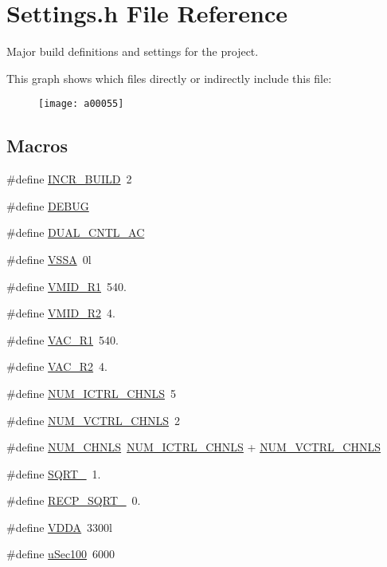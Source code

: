 \hypertarget{a00031}{\section{Settings.\-h File Reference}
\label{a00031}
}


Major build definitions and settings for the project.  


This graph shows which files directly or indirectly include this file\-:
\nopagebreak
\begin{figure}[H]
\begin{center}
\leavevmode
\texttt{[image: a00055]}
\end{center}
\end{figure}
\subsection*{Macros}
\begin{DoxyCompactItemize}
\item 
\#define \hyperlink{a00031_abf493281a7e64fe88660c38753e18d56}{I\-N\-C\-R\-\_\-\-B\-U\-I\-L\-D}~2
\item 
\#define \hyperlink{a00031_ad72dbcf6d0153db1b8d8a58001feed83}{D\-E\-B\-U\-G}
\item 
\#define \hyperlink{a00031_a600b96e7a1d3cd28e228833bb61f8074}{D\-U\-A\-L\-\_\-\-C\-N\-T\-L\-\_\-\-A\-C}
\item 
\#define \hyperlink{a00031_a3c2e957a61cfa19e31e8477fe3aacab8}{V\-S\-S\-A}~0l
\item 
\#define \hyperlink{a00031_a511faa1530ba984d340a884a97e6a80a}{V\-M\-I\-D\-\_\-\-R1}~540.
\item 
\#define \hyperlink{a00031_a86d7f47e3c125143c21e1ca2836eb4ab}{V\-M\-I\-D\-\_\-\-R2}~4.
\item 
\#define \hyperlink{a00031_a67fad1f78c49251e39fa6f1d5ff43e9e}{V\-A\-C\-\_\-\-R1}~540.
\item 
\#define \hyperlink{a00031_a087778c4195e73f588e5c3cf7d9e9206}{V\-A\-C\-\_\-\-R2}~4.
\item 
\#define \hyperlink{a00031_a69b2e41c3deaae85991311202c4a1a14}{N\-U\-M\-\_\-\-I\-C\-T\-R\-L\-\_\-\-C\-H\-N\-L\-S}~5
\item 
\#define \hyperlink{a00031_a42a316162edffd07a32e68a889760c06}{N\-U\-M\-\_\-\-V\-C\-T\-R\-L\-\_\-\-C\-H\-N\-L\-S}~2
\item 
\#define \hyperlink{a00031_afe433b138bb71d8d26b6e0907e656d1b}{N\-U\-M\-\_\-\-C\-H\-N\-L\-S}~\hyperlink{a00031_a69b2e41c3deaae85991311202c4a1a14}{N\-U\-M\-\_\-\-I\-C\-T\-R\-L\-\_\-\-C\-H\-N\-L\-S} + \hyperlink{a00031_a42a316162edffd07a32e68a889760c06}{N\-U\-M\-\_\-\-V\-C\-T\-R\-L\-\_\-\-C\-H\-N\-L\-S}
\item 
\#define \hyperlink{a00031_abc63ab2a8e7782de38a5dbdfc33da717}{S\-Q\-R\-T\-\_}~1.
\item 
\#define \hyperlink{a00031_ae468f418f2e6410dfcfeb58bcbbde516}{R\-E\-C\-P\-\_\-\-S\-Q\-R\-T\-\_}~0.
\item 
\#define \hyperlink{a00031_a2d52976aedaedf74a90019a689170620}{V\-D\-D\-A}~3300l
\item 
\#define \hyperlink{a00031_aa010c11f88da0f9a48a7dfd810412d5d}{u\-Sec100}~6000
\end{DoxyCompactItemize}
